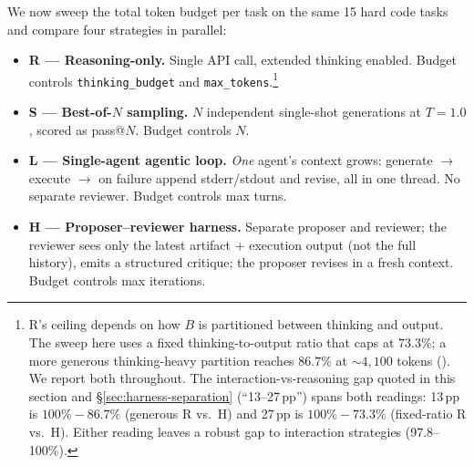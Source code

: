 \documentclass[11pt]{article}
\begin{document}
We now sweep the total token budget per task on the same 15 hard code tasks and compare four strategies in parallel:

\begin{itemize}[leftmargin=*,topsep=0.2ex,itemsep=0.2ex]
\item \textbf{R --- Reasoning-only.} Single API call, extended thinking enabled. Budget controls \texttt{thinking\_budget} and \texttt{max\_tokens}.\footnote{R's ceiling depends on how $B$ is partitioned between thinking and output. The sweep here uses a fixed thinking-to-output ratio that caps at $73.3\%$; a more generous thinking-heavy partition reaches $86.7\%$ at $\sim 4{,}100$ tokens (). We report both throughout. The interaction-vs-reasoning gap quoted in this section and §\ref{sec:harness-separation} (``13--27\,pp'') spans both readings: 13\,pp is $100\% - 86.7\%$ (generous R vs.\ H) and 27\,pp is $100\% - 73.3\%$ (fixed-ratio R vs.\ H). Either reading leaves a robust gap to interaction strategies (97.8--100\%).}
\item \textbf{S --- Best-of-$N$ sampling.} $N$ independent single-shot generations at $T{=}1.0$, scored as pass@$N$. Budget controls $N$.
\item \textbf{L --- Single-agent agentic loop.} \emph{One} agent's context grows: generate $\to$ execute $\to$ on failure append stderr/stdout and revise, all in one thread. No separate reviewer. Budget controls max turns.
\item \textbf{H --- Proposer--reviewer harness.} Separate proposer and reviewer; the reviewer sees only the latest artifact + execution output (not the full history), emits a structured critique; the proposer revises in a fresh context. Budget controls max iterations.
\end{itemize}
\end{document}
